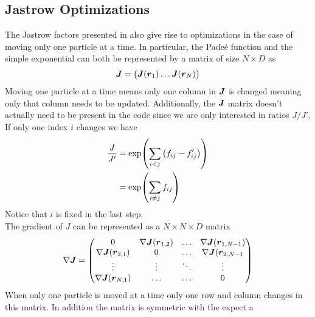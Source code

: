 \subsection{Jastrow Optimizations}
    The Jastrow factors presented in  also give rise to optimizations
    in the case of moving only one particle at a time. In particular, the
    Pade\'e function and the simple exponential can both be represented by a
    matrix of size $N\times D$ as
        \begin{equation}
            \blds{J} = 
                \begin{pmatrix}
                    \blds{J}(\blds{r}_1) \dots \blds{J}(\blds{r}_N)
                \end{pmatrix}
        \end{equation}
    Moving one particle at a time means only one column in $\boldsymbol{{J}}$ is
    changed meaning only that column needs to be updated. Additionally, the
    $\boldsymbol{{J}}$ matrix doesn't actually need to be present in the code since we
    are only interested in ratios $J/J'$. If only one index $i$ changes we have
        \begin{align}
            \frac{J}{J'} &= \exp(\sum\limits_{i<j} \left(f_{ij} - f'_{ij}\right))
            \nonumber \\
            &= \exp(\sum\limits_{i\neq j} f_{ij})
        \end{align}
    Notice that $i$ is fixed in the last step. \\
    The gradient of $J$ can be represented as a $N\times N\times D$ matrix
        \begin{equation}
            \nabla \boldsymbol{{J}} = 
                \begin{pmatrix}
                    0 & \nabla \boldsymbol{{J}}(\boldsymbol{{r}}_{1,2}) & \dots & \nabla
                    \boldsymbol{{J}}(\boldsymbol{{r}}_{1,N-1}) \\
                    \nabla \boldsymbol{{J}}(\boldsymbol{{r}}_{2,1}) & 0 & \dots & \nabla
                    \boldsymbol{{J}}(\boldsymbol{{r}}_{2,N-1} \\
                    \vdots & \vdots & \ddots & \vdots \\
                    \nabla \boldsymbol{{J}}(\boldsymbol{{r}}_{N,1}) & \dots & \dots & 0 
                \end{pmatrix}
        \end{equation}
    When only one particle is moved at a time only one row and column changes
    in this matrix. In addition the matrix is symmetric with the expect a
